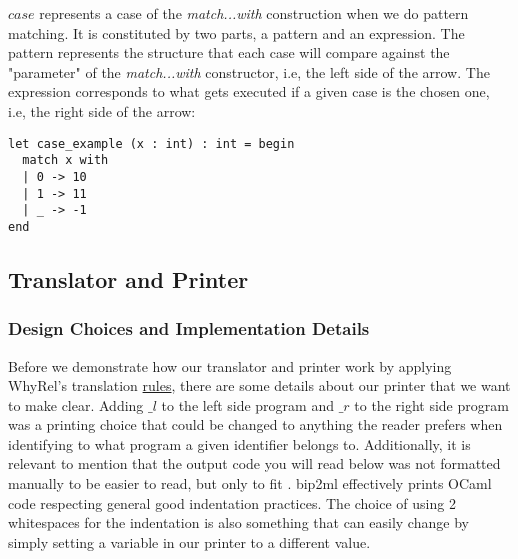 $case$ represents a case of the \emph{match...with} construction when we do pattern matching.
It is constituted by two parts, a pattern and an expression.
The pattern represents the structure that each case will compare against the "parameter" of the \emph{match...with} constructor, i.e, the left side of the arrow.
The expression corresponds to what gets executed if a given case is the chosen one, i.e, the right side of the arrow:

\begin{lstlisting}[mathescape, basicstyle=\ttfamily, columns=flexible,
                    emph={type, and, let, rec, if, then, else, mod, in, for, while, do, done, to, begin, end, assert, match, with, of, open, include,ref},
                    emphstyle=\ttfamily\bfseries\color{myorange}]
let case_example (x : int) : int = begin
  match x with
  | 0 -> 10
  | 1 -> 11
  | _ -> -1 
end
\end{lstlisting}


\FloatBarrier
\subsection{Translator and Printer}
\label{subsec:translator_printer}

\subsubsection{Design Choices and Implementation Details}
\label{subsubsec:translator_printer_details}

Before we demonstrate how our translator and printer work by applying WhyRel's translation \hyperref[fig:translation-biprograms-rules]{rules}, there are some details about our printer that we want to make clear.
Adding $\_l$ to the left side program and $\_r$ to the right side program was a printing choice that could be changed to anything the reader prefers when identifying to what program a given identifier belongs to.
Additionally, it is relevant to mention that the output code you will read below was not formatted manually to be easier to read, but only to fit .
bip2ml effectively prints OCaml code respecting general good indentation practices.
The choice of using 2 whitespaces for the indentation is also something that can easily change by simply setting a variable in our printer to a different value.

